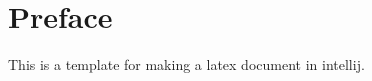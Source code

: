 
\chapter*{Preface}\label{ch:preface}

This is a template for making a latex document in intellij.

